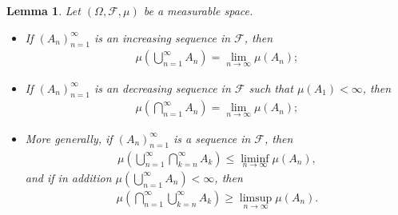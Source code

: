\documentclass{article}
\numberwithin{equation}{section}
\newcommand{\scr}{\mathscr}
\theoremstyle{plain}
\newtheorem{lemma}[theorem]{Lemma}
\theoremstyle{definition}
\begin{document}
\begin{lemma}\label{lemma:1.13} Let $(\Omega,\mathscr{F},\mu)$ be a measurable space.
	\begin{itemize}
		\item[(i)] If $(A_n)_{n=1}^\infty$ is an increasing sequence in $\mathscr{F}$, then
		\begin{align*}
			\mu\left(\bigcup_{n=1}^\infty A_n\right) = \lim_{n\to\infty}\mu(A_n);
		\end{align*}
		\item[(ii)] If $(A_n)_{n=1}^\infty$ is an decreasing sequence in $\mathscr{F}$ such that $\mu(A_1)<\infty$, then
		\begin{align*}
			\mu\left(\bigcap_{n=1}^\infty A_n\right) = \lim_{n\to\infty}\mu(A_n);
		\end{align*}
\item[(iii)] More generally, if $(A_n)_{n=1}^\infty$ is a sequence in $\scr{F}$, then
\begin{align*}
	\mu\left(\bigcup_{n=1}^\infty\bigcap_{k=n}^\infty A_k\right)\leq\liminf_{n\to\infty}\mu(A_n),
\end{align*}
and if in addition $\mu(\bigcup_{n=1}^\infty A_n)<\infty$, then
\begin{align*}
	\mu\left(\bigcap_{n=1}^\infty\bigcup_{k=n}^\infty A_k\right)\geq\limsup_{n\to\infty}\mu(A_n).
\end{align*}
\end{itemize}
\end{lemma}
\end{document}
